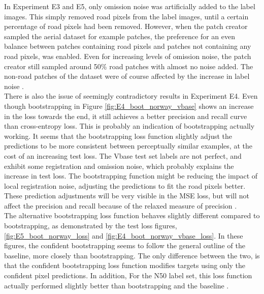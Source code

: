 In Experiment E3 and E5, only omission noise was artificially added to the label images. This simply removed road pixels from the label images, until a certain percentage of road pixels had been removed. However, when the patch creator sampled the aerial dataset for example patches, the preference for an even balance between patches containing road pixels and patches not containing any road pixels, was enabled. Even for increasing levels of omission noise, the patch creator still sampled around 50\% road patches with almost no noise added. The non-road patches of the dataset were of course affected by the increase in label noise .\\

There is also the issue of seemingly contradictory results in Experiment E4. Even though bootstrapping in Figure \ref{fig:E4_boot_norway_vbase} shows an increase in the loss towards the end, it still achieves a better precision and recall curve than cross-entropy loss. This is probably an indication of bootstrapping actually working. It seems that the bootstrapping loss function slightly adjust the predictions to be more consistent between perceptually similar examples, at the cost of an increasing test loss. The Vbase test set labels are not perfect, and exhibit some registration and omission noise, which probably explains the increase in test loss. The bootstrapping function might be reducing the impact of local registration noise,  adjusting the predictions to fit the road pixels better. These prediction adjustments will be very visible in the MSE loss, but will not affect the precision and recall because of the relaxed measure of precision . \\

The alternative bootstrapping loss function  behaves slightly different compared to bootstrapping, as demonstrated by the test loss figures, \ref{fig:E5_boot_norway_loss} and \ref{fig:E4_boot_norway_vbase_loss}. In these figures, the confident bootstrapping seems to follow the general outline of the baseline, more closely than bootstrapping. The only difference between the two, is that the confident bootstrapping loss function modifies targets using only the confident pixel predictions.  In addition, For the N50 label set, this loss function actually performed slightly better than bootstrapping and the baseline .\\ 

